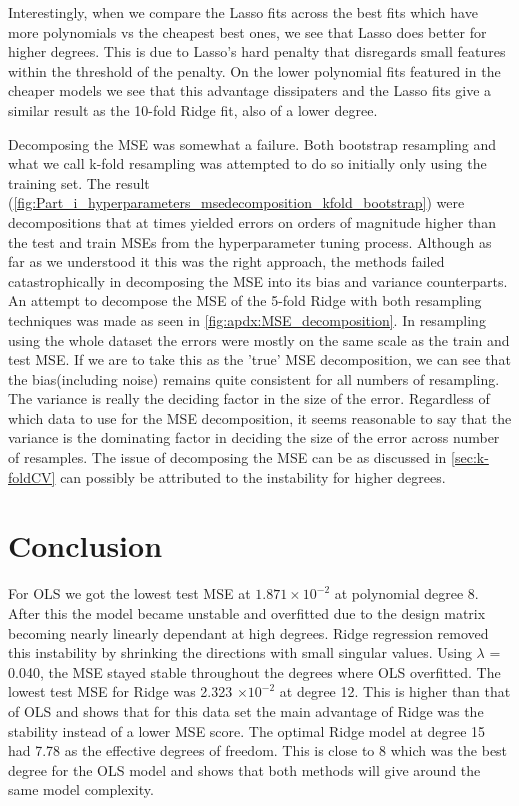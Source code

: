 \documentclass[reprint,english,notitlepage]{revtex4-2}  %
\begin{document}
Interestingly, when we compare the Lasso fits across the best fits which have more polynomials vs the cheapest best ones, we see that Lasso does better for higher degrees. This is due to Lasso's hard penalty that disregards small features within the threshold of the penalty. On the lower polynomial fits featured in the cheaper models we see that this advantage dissipaters and the Lasso fits give a similar result as the 10-fold Ridge fit, also of a lower degree. 

Decomposing the MSE was somewhat a failure. Both bootstrap resampling and what we call k-fold resampling was attempted to do so initially only using the training set. The result (\cref{fig:Part_i_hyperparameters_msedecomposition_kfold_bootstrap}) were decompositions that at times yielded errors on orders of magnitude higher than the test and train MSEs from the hyperparameter tuning process. Although as far as we understood it this was the right approach, the methods failed catastrophically in decomposing the MSE into its bias and variance counterparts. An attempt to decompose the MSE of the 5-fold Ridge with both resampling techniques was made as seen in \cref{fig:apdx:MSE_decomposition}. In resampling using the whole dataset the errors were mostly on the same scale as the train and test MSE. If we are to take this as the 'true' MSE decomposition, we can see that the bias(including noise) remains quite consistent for all numbers of resampling. The variance is really the deciding factor in the size of the error. Regardless of which data to use for the MSE decomposition, it seems reasonable to say that the variance is the dominating factor in deciding the size of the error across number of resamples. The issue of decomposing the MSE can be as discussed in \cref{sec:k-foldCV} can possibly be attributed to the instability for higher degrees.

\clearpage
\section{Conclusion} \label{sec:Conclusion}

For OLS we got the lowest test MSE at $1.871 \times 10^{-2}$ at polynomial degree 8. After this the model became unstable and overfitted due to the design matrix becoming nearly linearly dependant at high degrees. Ridge regression removed this instability by shrinking the directions with small singular values. Using $\lambda$ = 0.040, the MSE stayed stable throughout the degrees where OLS overfitted. The lowest test MSE for Ridge was 2.323 $\times 10^{-2}$ at degree 12. This is higher than that of OLS and shows that for this data set the main advantage of Ridge was the stability instead of a lower MSE score. The optimal Ridge model at degree 15 had 7.78 as the effective degrees of freedom. This is close to 8 which was the best degree for the OLS model and shows that both methods will give around the same model complexity.
\end{document}
